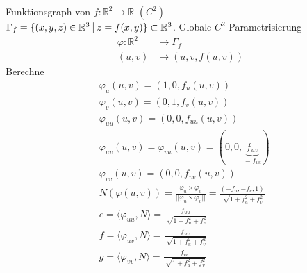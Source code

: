 \documentclass[../main.tex]{subfiles}
\begin{document}
\begin{example}
    Funktionsgraph von $f: \mathbb{R}^{2} \rightarrow \mathbb{R}$ $(C^{2})$\\
    $\Gamma_{f} = \{(x,y,z)\in\mathbb{R}^{3} \ \vline \ z = f(x,y)\} \subset \mathbb{R}^{3}$. Globale $C^{2}$-Parametrisierung \begin{align*}
        \varphi:\mathbb{R}^{2} &\rightarrow \Gamma_{f}\\
        (u,v) &\mapsto (u,v,f(u,v))
    \end{align*}
    Berechne 
    \begin{align*}
        &\varphi_{u}(u,v) = (1, 0, f_{u}(u,v))\\
        &\varphi_{v}(u,v) = (0, 1, f_{v}(u,v))\\
        &\varphi_{uu}(u,v) = (0, 0, f_{uu}(u,v))\\
        &\varphi_{uv}(u,v) = \varphi_{vu}(u,v) = (0, 0, \underbrace{f_{uv}}_{=f_{vu}})\\
        &\varphi_{vv}(u,v) = (0, 0, f_{vv}(u,v))\\
        &N(\varphi(u,v)) = \frac{\varphi_{u}\times\varphi_{v}}{|| \varphi_{u}\times\varphi_{v} ||} = \frac{(-f_{u}, -f_{v}, 1)}{\sqrt[]{1 + f_{u}^{2}+f_{v}^{2}}}\\
        &e = \langle \varphi_{uu}, N \rangle = \frac{f_{uu}}{\sqrt[]{1 + f_{u}^{2}+f_{v}^{2}}}\\
        &f = \langle \varphi_{uv}, N \rangle = \frac{f_{uv}}{\sqrt[]{1 + f_{u}^{2}+f_{v}^{2}}}\\
        &g = \langle \varphi_{vv}, N \rangle = \frac{f_{vv}}{\sqrt[]{1 + f_{u}^{2}+f_{v}^{2}}}\\
    \end{align*}
\end{example}
\end{document}

